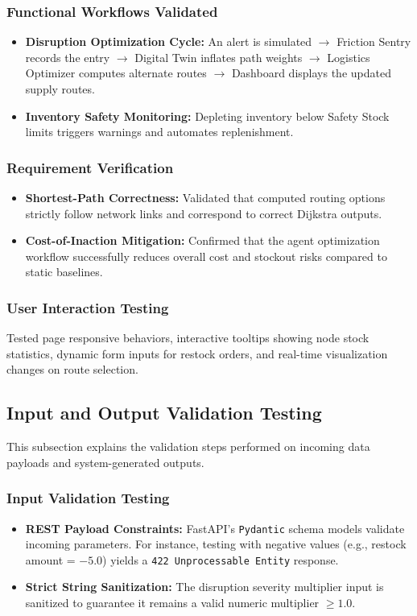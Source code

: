 \subsubsection{Functional Workflows Validated}
\begin{itemize}
    \item \textbf{Disruption Optimization Cycle:} An alert is simulated $\rightarrow$ Friction Sentry records the entry $\rightarrow$ Digital Twin inflates path weights $\rightarrow$ Logistics Optimizer computes alternate routes $\rightarrow$ Dashboard displays the updated supply routes.
    \item \textbf{Inventory Safety Monitoring:} Depleting inventory below Safety Stock limits triggers warnings and automates replenishment.
\end{itemize}

\subsubsection{Requirement Verification}
\begin{itemize}
    \item \textbf{Shortest-Path Correctness:} Validated that computed routing options strictly follow network links and correspond to correct Dijkstra outputs.
    \item \textbf{Cost-of-Inaction Mitigation:} Confirmed that the agent optimization workflow successfully reduces overall cost and stockout risks compared to static baselines.
\end{itemize}

\subsubsection{User Interaction Testing}
Tested page responsive behaviors, interactive tooltips showing node stock statistics, dynamic form inputs for restock orders, and real-time visualization changes on route selection.

\subsection[Input and Output Validation Testing]{Input and Output Validation Testing}
This subsection explains the validation steps performed on incoming data payloads and system-generated outputs.

\subsubsection{Input Validation Testing}
\begin{itemize}
    \item \textbf{REST Payload Constraints:} FastAPI's \texttt{Pydantic} schema models validate incoming parameters. For instance, testing with negative values (e.g., restock amount = $-5.0$) yields a \texttt{422 Unprocessable Entity} response.
    \item \textbf{Strict String Sanitization:} The disruption severity multiplier input is sanitized to guarantee it remains a valid numeric multiplier $\ge 1.0$.
\end{itemize}

